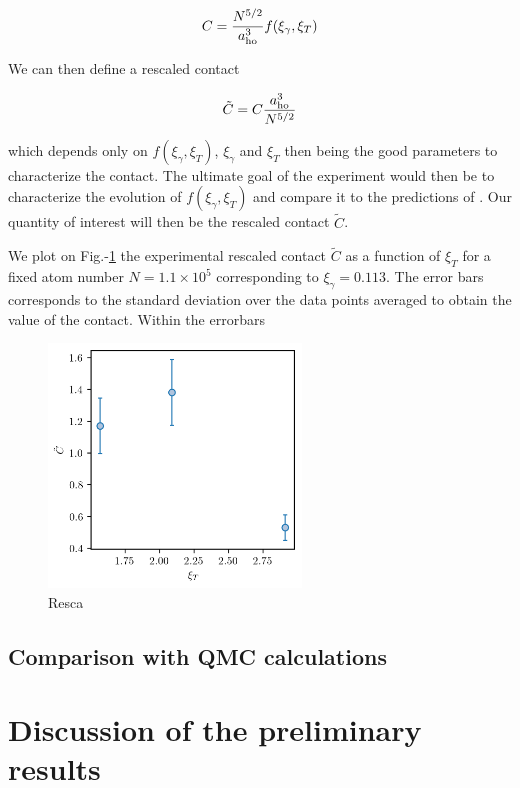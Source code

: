 \begin{equation}
    C= \frac{N^{5/2}}{a_{\rm{ho}}^3} f(\xi_{\gamma},\xi_{T})
\end{equation}

\noindent We can then define a rescaled contact

\begin{equation}
    \tilde{C}=C \frac{a_{\rm{ho}}^3}{N^{5/2}}
\end{equation}

\noindent which depends only on $f(\xi_{\gamma},\xi_{T})$, $\xi_{\gamma}$ and $\xi_{T}$ then being the good parameters to characterize the contact. The ultimate goal of the experiment would then be to characterize the evolution of $f(\xi_{\gamma},\xi_{T})$ and compare it to the predictions of \cite{yao2018tan}. Our quantity of interest will then be the rescaled contact $\tilde{C}$.



We plot on Fig.-\ref{fig:C_tilde_vs_T} the experimental rescaled contact $\tilde{C}$ as a function of $\xi_T$ for a fixed atom number $N=1.1 \times 10^5$ corresponding to $\xi_{\gamma}=0.113$. The error bars corresponds to the standard deviation over the data points averaged to obtain the value of the contact. Within the errorbars

\begin{figure}
    \centering
    \includegraphics[width=0.6\textwidth]{Fig/Chapter5/C_tilde_vs_T.png}
    \caption{Resca}
    \label{fig:C_tilde_vs_T}
\end{figure}

\subsection{Comparison with QMC calculations}

\section{Discussion of the preliminary results}